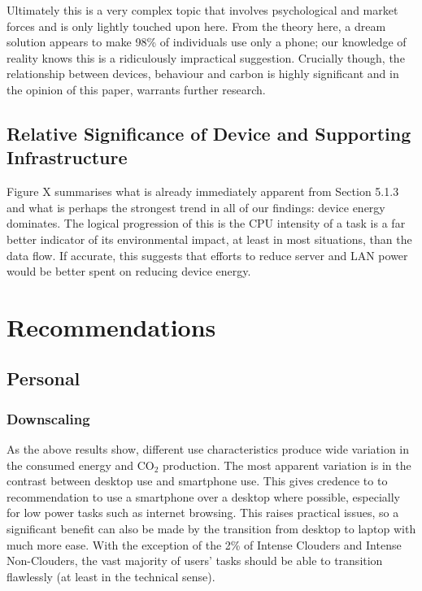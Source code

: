 \documentclass[conference]{IEEEtran}
\begin{document}
Ultimately this is a very complex topic that involves psychological
and market forces and is only lightly touched upon here. From the
theory here, a dream solution appears to make 98\% of individuals use
only a phone; our knowledge of reality knows this is a ridiculously
impractical suggestion. Crucially though, the relationship between
devices, behaviour and carbon is highly significant and in the opinion
of this paper, warrants further research.

\subsection{Relative Significance of Device and Supporting
  Infrastructure}

Figure X summarises what is already immediately apparent from Section
5.1.3 and what is perhaps the strongest trend in all of our findings:
device energy dominates. The logical progression of this is the CPU
intensity of a task is a far better indicator of its environmental
impact, at least in most situations, than the data flow.  If accurate,
this suggests that efforts to reduce server and LAN power would be
better spent on reducing device energy.

\section{Recommendations}

\subsection{Personal}

\subsubsection{Downscaling}

As the above results show, different use characteristics produce wide
variation in the consumed energy and CO$_2$ production. The most apparent
variation is in the contrast between desktop use and smartphone
use. This gives credence to to recommendation to use a smartphone over
a desktop where possible, especially for low power tasks such as
internet browsing. This raises practical issues, so a significant
benefit can also be made by the transition from desktop to laptop with
much more ease. With the exception of the 2\% of Intense Clouders and
Intense Non-Clouders, the vast majority of users’ tasks should be able
to transition flawlessly (at least in the technical sense).
\end{document}

